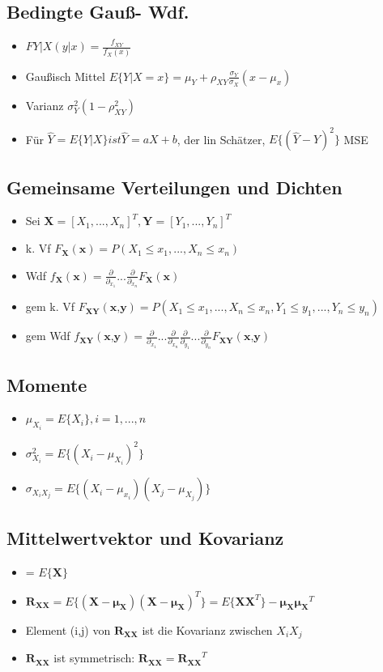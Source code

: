 \documentclass{article}
\begin{document}
\subsection{Bedingte Gau\ss - Wdf.}
\begin{itemize}
\item$F{Y|X}(y|x) = \frac{f_{XY}}{f_X(x)}$
\item Gau\ss isch Mittel  $E\{Y|X=x\} = \mu_Y + \rho_{XY} \frac{\sigma_Y}{\sigma_X}(x-\mu_x)$
\item Varianz $\sigma_Y^2(1-\rho_{XY}^2)$
\item Für $\hat{Y} = E\{Y|X\} ist \hat{Y} = aX+b$, der lin Schätzer, $E\{(\hat{Y}-Y)^2\}$ MSE
\end{itemize}

\subsection{Gemeinsame Verteilungen und Dichten}
\begin{itemize}
\item Sei $\textbf{X} = [X_1, ..., X_n]^T, \textbf{Y} = [Y_1, ..., Y_n]^T$
\item  k. Vf $F_\textbf{X}(\textbf{x}) = P(X_1 \leq x_1, ..., X_n \leq x_n) $
\item  Wdf $f_\textbf{X}(\textbf{x}) = \frac{\partial}{\partial_{x_1}} ... \frac{\partial}{\partial_{x_n}} F_\textbf{X}(\textbf{x})$
\item gem  k. Vf $F_\textbf{XY}(\textbf{x,y}) = P(X_1 \leq x_1, ..., X_n \leq x_n, Y_1 \leq y_1, ..., Y_n \leq y_n) $
\item gem Wdf $f_\textbf{XY}(\textbf{x,y}) = \frac{\partial}{\partial_{x_1}} ... \frac{\partial}{\partial_{x_n}} \frac{\partial}{\partial_{y_1}} ... \frac{\partial}{\partial_{y_n}}F_\textbf{XY}(\textbf{x,y})$
\end{itemize}

\subsection{Momente}
\begin{itemize}
\item $\mu_{X_i} = E\{X_i\}, i = 1, ...,n$
\item $\sigma_{X_i}^2 = E\{(X_i - \mu_{X_i})^2 \}$
\item $\sigma_{X_i X_j} = E\{ (X_i-\mu_{x_i})(X_j-\mu_{X_j})\}$
\end{itemize}

\subsection{Mittelwertvektor und Kovarianz}
\begin{itemize}
\item  {} = $E \{ \bm{X} \} $
\item $\bm{R_{XX}} = E\{(\bm{X}- \bm{\mu_X})(\bm{X}- \bm{\mu_X})^T  \} = E\{\bm{XX}^T \}-\bm{\mu_X\mu_X}^T$
\item Element (i,j) von $\bm{R_{XX}}$ ist die Kovarianz zwischen $X_i X_j$
\item $\bm{R_{XX}}$ ist symmetrisch: $\bm{R_{XX}} = \bm{R_{XX}}^T$
\end{itemize}
\end{document}
